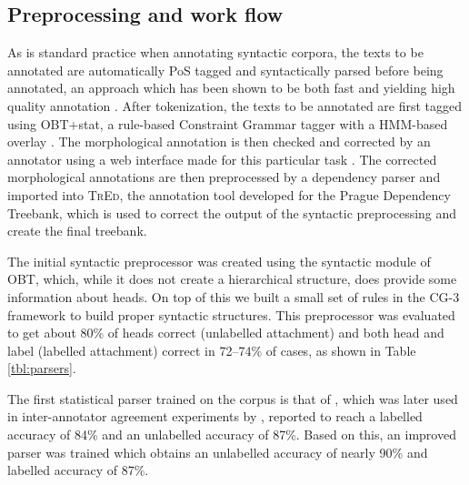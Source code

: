 \documentclass[11pt,a4paper]{article}
\let\app=\textsc
\begin{document}
\subsection{Preprocessing and work flow}
As is standard practice when annotating syntactic corpora, the texts to be
annotated are automatically PoS tagged and syntactically parsed before being
annotated, an approach which has been shown to be both fast and yielding
high quality annotation \cite{Mar:San:Mar:93,For:Sag:10,Skjaerholt:13}.
After tokenization, the texts to be annotated are first tagged using OBT+stat,
a rule-based Constraint Grammar tagger with a HMM-based overlay \cite{Johannessen:etal:12}.
 The morphological annotation is then checked and corrected by an annotator using a web interface made for this
particular task \cite{Lyn:13}. The corrected morphological annotations are
then preprocessed by a dependency parser and imported into \app{TrEd}, the
annotation tool developed for the Prague Dependency Treebank, which is used to
correct the output of the syntactic preprocessing and create the final
treebank.

The initial syntactic preprocessor was created using
the syntactic module of OBT, which, while it does not create a hierarchical
structure, does provide some information about heads. On top of this we built
a small set of rules in the CG-3 framework \cite{Did:2013} to build proper
syntactic structures. This preprocessor was evaluated to get about 80\% of
heads correct (unlabelled attachment) and both head and label (labelled
attachment) correct in 72--74\% of cases, as shown in Table \ref{tbl:parsers}.

The first statistical parser trained on the corpus is that of
, which was later used in inter-annotator agreement
experiments by , reported to reach a labelled accuracy of
84\% and an unlabelled accuracy of 87\%. Based on this, an improved parser was
trained which obtains an unlabelled accuracy of nearly 90\% and labelled
accuracy of 87\%.
\end{document}
